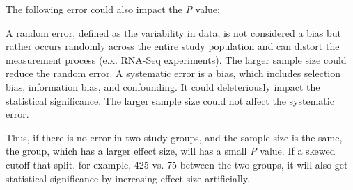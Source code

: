 \documentclass[preprint,12pt]{elsarticle}
\newenvironment{MyIndent}
{\par\leftskip1cm\relax\rightskip1cm\relax}
{\par\leftskip0cm\relax\rightskip0cm\relax}
\newenvironment{MyColorPar}[1]{%
    \leavevmode\color{#1}\ignorespaces%
}{%
}%
\begin{document}
\begin{MyColorPar}{blue}
\begin{MyIndent}
\begin{MyColorPar}{red}
The following error could also impact the \textit{P} value:
\begin{outline}
\1 A random error, defined as the variability in data, is not considered a bias but rather occurs randomly across the entire study population and can distort the measurement process (e.x. RNA-Seq experiments).
The larger sample size could reduce the random error. 
\1 A systematic error is a bias, which includes selection bias, information bias, and confounding.
It could deleteriously impact the statistical significance.
The larger sample size could not affect the systematic error.
\end{outline}
Thus, if there is no error in two study groups, and the sample size is the same, the group, which has a larger effect size, will has a small \textit{P} value\cite{Thiese2016}.
If a skewed cutoff that split, for example, 425 vs. 75 between the two groups, it will also get statistical significance by increasing effect size artificially.





\end{MyColorPar}
\end{MyIndent}
\end{MyColorPar}
\end{document}
